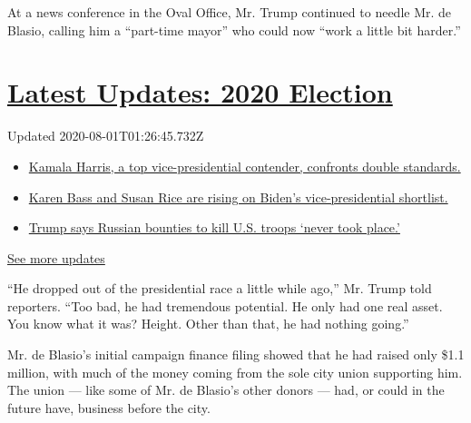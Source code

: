 At a news conference in the Oval Office, Mr. Trump continued to needle
Mr. de Blasio, calling him a ``part-time mayor'' who could now ``work a
little bit harder.''

\hypertarget{latest-updates-2020-election}{%
\section{\texorpdfstring{\href{https://www.nytimes.com/2020/07/31/us/elections/biden-vs-trump.html?action=click\&pgtype=Article\&state=default\&region=MAIN_CONTENT_1\&context=storylines_live_updates}{Latest
Updates: 2020
Election}}{Latest Updates: 2020 Election}}\label{latest-updates-2020-election}}

Updated 2020-08-01T01:26:45.732Z

\begin{itemize}
\tightlist
\item
  \href{https://www.nytimes.com/2020/07/31/us/elections/biden-vs-trump.html?action=click\&pgtype=Article\&state=default\&region=MAIN_CONTENT_1\&context=storylines_live_updates\#link-29fdff45}{Kamala
  Harris, a top vice-presidential contender, confronts double
  standards.}
\item
  \href{https://www.nytimes.com/2020/07/31/us/elections/biden-vs-trump.html?action=click\&pgtype=Article\&state=default\&region=MAIN_CONTENT_1\&context=storylines_live_updates\#link-13ec3d9c}{Karen
  Bass and Susan Rice are rising on Biden's vice-presidential
  shortlist.}
\item
  \href{https://www.nytimes.com/2020/07/31/us/elections/biden-vs-trump.html?action=click\&pgtype=Article\&state=default\&region=MAIN_CONTENT_1\&context=storylines_live_updates\#link-49e9a016}{Trump
  says Russian bounties to kill U.S. troops `never took place.'}
\end{itemize}

\href{https://www.nytimes.com/2020/07/31/us/elections/biden-vs-trump.html?action=click\&pgtype=Article\&state=default\&region=MAIN_CONTENT_1\&context=storylines_live_updates}{See
more updates}

``He dropped out of the presidential race a little while ago,'' Mr.
Trump told reporters. ``Too bad, he had tremendous potential. He only
had one real asset. You know what it was? Height. Other than that, he
had nothing going.''

Mr. de Blasio's initial campaign finance filing showed that he had
raised only \$1.1 million, with much of the money coming from the sole
city union supporting him. The union --- like some of Mr. de Blasio's
other donors --- had, or could in the future have, business before the
city.


